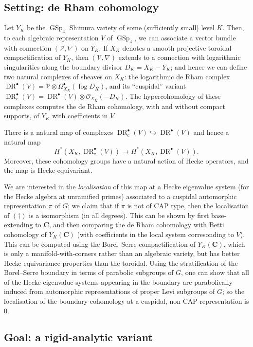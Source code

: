 \documentclass[cjm]{ipart}
\theoremstyle{plain}
\theoremstyle{remark}
\DeclareMathOperator{\DR}{DR}
\DeclareMathOperator{\GSp}{GSp}
\newcommand{\CC}{\mathbf{C}}
\newcommand{\cO}{\mathcal{O}}
\newcommand{\cV}{\mathcal{V}}
\newcommand{\into}{\hookrightarrow}
\numberwithin{equation}{subsection}
\begin{document}
 \subsection{Setting: de Rham cohomology}

  Let $Y_K$ be the $\GSp_4$ Shimura variety of some (sufficiently small) level $K$. Then, to each algebraic representation $V$ of $\GSp_4$, we can associate a vector bundle with connection $(\cV, \nabla)$ on $Y_K$. If $X_K$ denotes a smooth projective toroidal compactification of $Y_K$, then $(\cV, \nabla)$ extends to a connection with logarithmic singularities along the boundary divisor $D_K = X_K - Y_K$; and hence we can define two natural complexes of sheaves on $X_K$: the logarithmic de Rham complex $\DR^\bullet(V) = \mathcal{V} \otimes \Omega^\bullet_{X_K}(\log D_K)$, and its ``cuspidal'' variant $\DR^\bullet_c(V) = \DR^\bullet(V) \otimes \cO_{X_K}(-D_K)$. The hypercohomology of these complexes computes the de Rham cohomology, with and without compact supports, of $Y_K$ with coefficients in $V$.

  There is a natural map of complexes $\DR^\bullet_c(V) \into \DR^\bullet(V)$ and hence a natural map
  \[ H^*(X_K, \DR^\bullet_c(V)) \to H^*(X_K, \DR^\bullet(V)). \tag{\dag} \]
  Moreover, these cohomology groups have a natural action of Hecke operators, and the map is Hecke-equivariant.

  We are interested in the \emph{localisation} of this map at a Hecke eigenvalue system (for the Hecke algebra at unramified primes) associated to a cuspidal automorphic representation $\pi$ of $G$; we claim that if $\pi$ is not of CAP type, then the localisation of $(\dag)$ is a isomorphism (in all degrees). This can be shown by first base-extending to $\CC$, and then comparing the de Rham cohomology with Betti cohomology of $Y_K(\CC)$ (with coefficients in the local system corresonding to $V$). This can be computed using the Borel--Serre compactification of $Y_K(\CC)$, which is only a manifold-with-corners rather than an algebraic variety, but has better Hecke-equivariance properties than the toroidal. Using the stratification of the Borel--Serre boundary in terms of parabolic subgroups of $G$, one can show that all of the Hecke eigenvalue systems appearing in the boundary are parabolically induced from automorphic representations of proper Levi subgroups of $G$; so the localisation of the boundary cohomology at a cuspidal, non-CAP representation is 0.

 \subsection{Goal: a rigid-analytic variant}
\end{document}
